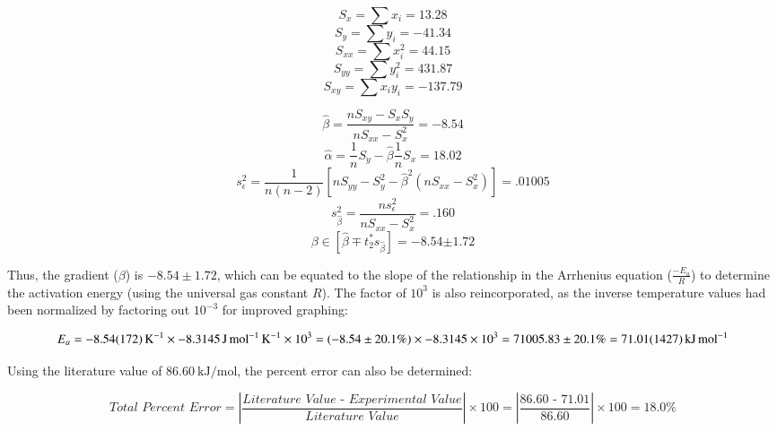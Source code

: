  \begin{minipage}{.5\linewidth}
  $$S_x = \sum x_i = 13.28$$
  $$S_y = \sum y_i = -41.34$$
  $$S_{xx} = \sum x_i^2 = 44.15$$
  $$S_{yy} = \sum y_i^2 = 431.87$$
  $$S_{xy} = \sum x_iy_i = -137.79$$
 \end{minipage}
  \begin{minipage}{.5\linewidth}
  $$\hat{\beta} = \frac{nS_{xy} - S_xS_y}{nS_{xx} - S_x^2} = -8.54$$
  $$\hat{\alpha} = \frac{1}{n}S_y - \hat{\beta}\frac{1}{n}S_x =  18.02$$
  $$s_{\epsilon}^2 = \frac{1}{n(n-2)}\left[nS_{yy} - S_y^2 - \hat{\beta}^2(nS_{xx} - S_x^2)\right] = .01005$$
  $$s_{\hat{\beta}}^2 = \frac{ns_{\epsilon}^2}{nS_{xx} - S_x^2} = .160$$
  $$\beta \in [\hat{\beta} \mp t_{2}^*s_{\hat{\beta}}] = \bm{-8.54} \bm{\pm} \bm{1.72}$$
 \end{minipage}

 Thus, the gradient ($\beta$) is $-8.54 \pm 1.72$, which can be equated to the slope of the relationship in the Arrhenius equation ($\frac{-E_a}{R}$) to determine the activation energy (using the universal gas constant $R$). The factor of $10^3$ is also reincorporated, as the inverse temperature values had been normalized by factoring out $10^{-3}$ for improved graphing:

 \[E_a = \SI{-8.54\pm1.72}{\per\kelvin} \times -\SI{8.3145}{\joule\per\mole\per\kelvin} \times 10^3 = (-8.54 \pm 20.1\%) \times -8.3145 \times 10^3 = 71005.83 \pm 20.1\% = \SI{71.01\pm14.27}{\kilo\joule\per\mole}\]

 Using the literature value of $\SI{86.60}{\kilo\joule\per\mole}$, the percent error can also be determined:

 \[\textit{Total Percent Error} = \left|\frac{\textit{Literature Value - Experimental Value}}{\textit{Literature Value}}\right| \times 100 = \left|\frac{\textit{86.60 - 71.01}}{\textit{86.60}}\right| \times 100 = 18.0\%\]





